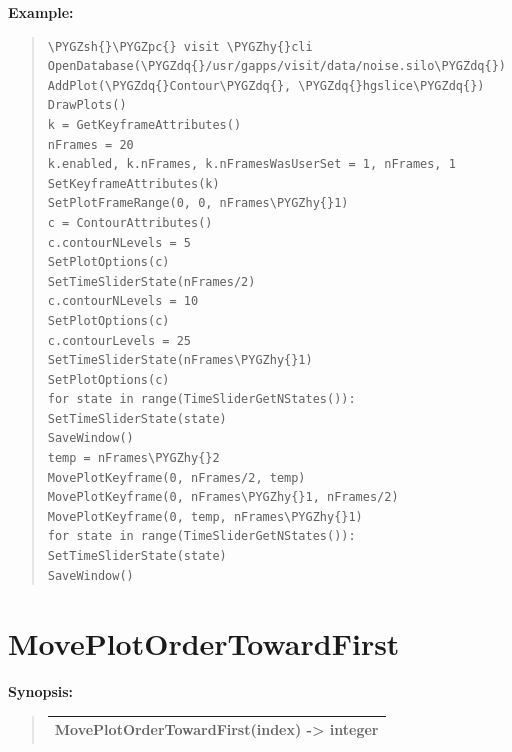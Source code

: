 \documentclass[letterpaper,10pt,english]{sphinxmanual}
\def\PYGZsh{\char`\#}
\def\PYGZpc{\char`\%}
\def\PYGZhy{\char`\-}
\def\PYGZdq{\char`\"}
\begin{document}
\begin{DUlineblock}{0em}
\item[] \textbf{Example:}
\item[] 
\end{DUlineblock}
\begin{quote}

\begin{Verbatim}[commandchars=\\\{\}]
\PYGZsh{}\PYGZpc{} visit \PYGZhy{}cli
OpenDatabase(\PYGZdq{}/usr/gapps/visit/data/noise.silo\PYGZdq{})
AddPlot(\PYGZdq{}Contour\PYGZdq{}, \PYGZdq{}hgslice\PYGZdq{})
DrawPlots()
k = GetKeyframeAttributes()
nFrames = 20
k.enabled, k.nFrames, k.nFramesWasUserSet = 1, nFrames, 1
SetKeyframeAttributes(k)
SetPlotFrameRange(0, 0, nFrames\PYGZhy{}1)
c = ContourAttributes()
c.contourNLevels = 5
SetPlotOptions(c)
SetTimeSliderState(nFrames/2)
c.contourNLevels = 10
SetPlotOptions(c)
c.contourLevels = 25
SetTimeSliderState(nFrames\PYGZhy{}1)
SetPlotOptions(c)
for state in range(TimeSliderGetNStates()):
SetTimeSliderState(state)
SaveWindow()
temp = nFrames\PYGZhy{}2
MovePlotKeyframe(0, nFrames/2, temp)
MovePlotKeyframe(0, nFrames\PYGZhy{}1, nFrames/2)
MovePlotKeyframe(0, temp, nFrames\PYGZhy{}1)
for state in range(TimeSliderGetNStates()):
SetTimeSliderState(state)
SaveWindow()
\end{Verbatim}
\end{quote}


\section{MovePlotOrderTowardFirst}
\label{functions:moveplotordertowardfirst}
\begin{DUlineblock}{0em}
\item[] \textbf{Synopsis:}
\end{DUlineblock}
\begin{quote}

\begin{tabulary}{\linewidth}{|L|}
\hline

MovePlotOrderTowardFirst(index) -\textgreater{} integer
\\
\hline\end{tabulary}

\end{quote}
\end{document}
